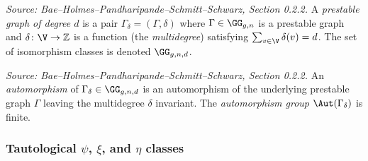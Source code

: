 \begin{definition}
  \label{def:prestable_graph_degree}
  \textit{Source: Bae--Holmes--Pandharipande--Schmitt--Schwarz, Section 0.2.2.}
  A \emph{prestable graph of degree $d$} is a pair $\Gamma_\delta = (\Gamma, \delta)$
  where $\Gamma \in \GG_{g,n}$ is a prestable graph and $\delta\colon \V \to \mathbb{Z}$
  is a function (the \emph{multidegree}) satisfying $\sum_{v \in \V} \delta(v) = d$.
  The set of isomorphism classes is denoted $\GG_{g,n,d}$.
\end{definition}

\begin{definition}
  \label{def:aut_prestable_graph_degree}
  \textit{Source: Bae--Holmes--Pandharipande--Schmitt--Schwarz, Section 0.2.2.}
  An \emph{automorphism} of $\Gamma_\delta \in \GG_{g,n,d}$ is an automorphism of the
  underlying prestable graph $\Gamma$ leaving the multidegree $\delta$ invariant.
  The \emph{automorphism group} $\Aut(\Gamma_\delta)$ is finite.
\end{definition}

\subsubsection{Tautological $\psi$, $\xi$, and $\eta$ classes}

